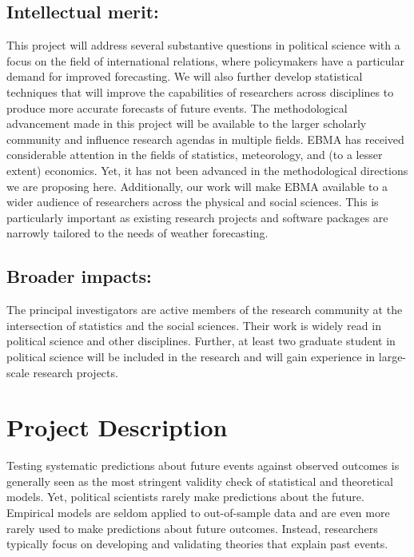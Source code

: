 \documentclass[pdftex,12pt,fullpage,oneside]{amsart}
\begin{document}

\subsection*{Intellectual merit:} 
This project will address several substantive questions in political
science with a focus on the field of international relations, where
policymakers have a particular demand for improved forecasting.  We
will also further develop statistical techniques that will improve the
capabilities of researchers across disciplines to produce more
accurate forecasts of future events. The methodological advancement
made in this project will be available to the larger scholarly
community and influence research agendas in multiple fields.  EBMA has
received considerable attention in the fields of statistics,
meteorology, and (to a lesser extent) economics.  Yet, it has not been
advanced in the methodological directions we are proposing here.
Additionally, our work will make EBMA available to a wider
audience of researchers across the physical and social sciences.  This
is particularly important as existing research projects and software
packages are narrowly tailored to the needs of weather forecasting.

\subsection*{Broader impacts:}
The principal investigators are active members of the research
community at the intersection of statistics and the social
sciences. Their work is widely read in political science and other
disciplines. Further, at least two graduate student in political
science will be included in the research and will gain experience in
large-scale research projects.

\newpage
\setcounter{page}{1}

\section*{Project Description}

Testing systematic predictions about future events against observed
outcomes is generally seen as the most stringent validity check of
statistical and theoretical models.  Yet, political scientists rarely
make predictions about the future.  Empirical models are seldom
applied to out-of-sample data and are even more rarely used to make
predictions about future outcomes. Instead, researchers typically
focus on developing and validating theories that explain past events.
\end{document}
